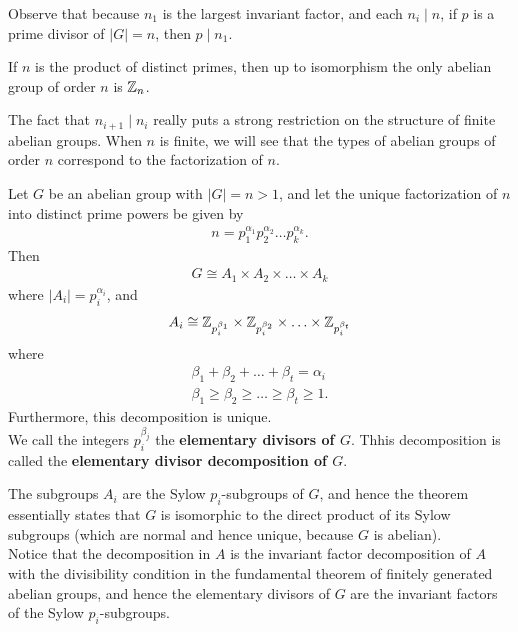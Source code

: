 \documentclass{memoir}
\begin{document}
Observe that because \(n_1\) is the largest invariant factor, and each \(n_i\mid n\), if \(p\) is a prime divisor of \(\left| G \right| =n\), then \(p \mid n_1\).

\begin{cor}
	If \(n\) is the product of distinct primes, then up to isomorphism the only abelian group of order \(n\) is \(\mathbb{Z}_n\).
\end{cor}

The fact that \(n_{i+1} \mid n_i\) really puts a strong restriction on the structure of finite abelian groups. When \(n\) is finite, we will see that the types of abelian groups of order \(n\) correspond to the factorization of \(n\).

\begin{thm}
	Let \(G\) be an abelian group with \(\left| G \right| =n >1\), and let the unique factorization of \(n\) into distinct prime powers be given by
	\begin{align*}
		n = p^{\alpha_1}_1 p_2^{\alpha_2}\ldots p_k^{\alpha_k}.
	\end{align*}
	Then
	\begin{align*}
		G \cong A_1\times A_2 \times \ldots\times A_k
	\end{align*}
	where \(\left| A_i \right| = p_i^{\alpha_i}\), and
	\begin{align*}
		A_i \cong \mathbb{Z}_{p_i^{\beta_1}}\times \mathbb{Z}_{p_i^{\beta_2}}\times \ldots\times \mathbb{Z}_{p_i^{\beta_t}}
	\end{align*}
	where
	\begin{align*}
		\beta_1 + \beta_2 + \ldots + \beta_t = \alpha_i \\
		\beta_1\geq \beta_2\geq \ldots\geq \beta_t \geq 1.
	\end{align*}
	Furthermore, this decomposition is unique.\\

	We call the integers \(p_i^{\beta_j}\) the \textbf{elementary divisors of \(G\)}. Thhis decomposition is called the \textbf{elementary divisor decomposition of \(G\)}.
\end{thm}
The subgroups \(A_i\) are the Sylow \(p_i\)-subgroups of \(G\), and hence the theorem essentially states that \(G\) is isomorphic to the direct product of its Sylow subgroups (which are normal and hence unique, because \(G\) is abelian). \\

Notice that the decomposition in \(A\) is the invariant factor decomposition of \(A\) with the divisibility condition in the fundamental theorem of finitely generated abelian groups, and hence the elementary divisors of \(G\) are the invariant factors of the Sylow \(p_i\)-subgroups.\\
\end{document}
